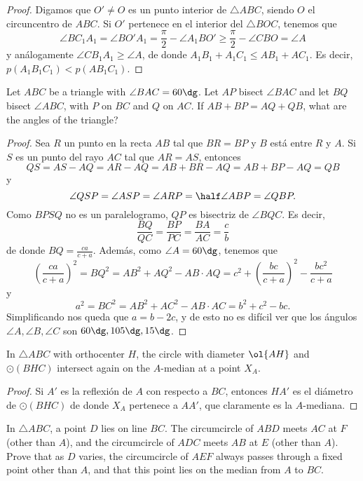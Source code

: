 \begin{proof}
	Digamos que $O'\ne O$ es un punto interior de $\triangle ABC$, siendo $O$ el circuncentro de $ABC$. Si $O'$ pertenece en el interior del $\triangle BOC$, tenemos que
	\[\angle BC_1A_1=\angle BO'A_1=\frac{\pi}{2}-\angle A_1BO'\ge\frac{\pi}{2}-\angle CBO=\angle A\]
	y análogamente $\angle CB_1A_1\ge\angle A$, de donde $A_1B_1+A_1C_1\le AB_1+AC_1$. Es decir, $p(A_1B_1C_1)<p(AB_1C_1)$.
\end{proof}

\begin{probEG}[ISL 2001/G8]
	Let $ABC$ be a triangle with $\angle BAC=60\dg$. Let $AP$ bisect $\angle BAC$ and let $BQ$ bisect $\angle ABC$, with $P$ on $BC$ and $Q$ on $AC$. If $AB+BP=AQ+QB$, what are the angles of the triangle?
\end{probEG}

\begin{proof}
	Sea $R$ un punto en la recta $AB$ tal que $BR=BP$ y $B$ está entre $R$ y $A$. Si $S$ es un punto del rayo $AC$ tal que $AR=AS$, entonces
	\[QS=AS-AQ=AR-AQ=AB+BR-AQ=AB+BP-AQ=QB\]
	y
	\[\angle QSP=\angle ASP=\angle ARP=\half\angle ABP=\angle QBP.\]
	Como $BPSQ$ no es un paralelogramo, $QP$ es bisectriz de $\angle BQC$. Es decir,
	\[\frac{BQ}{QC}=\frac{BP}{PC}=\frac{BA}{AC}=\frac{c}{b}\]
	de donde $BQ=\frac{ca}{c+a}$. Además, como $\angle A=60\dg$, tenemos que
	\[\left(\frac{ca}{c+a}\right)^2=BQ^2=AB^2+AQ^2-AB\cdot AQ=c^2+\left(\frac{bc}{c+a}\right)^2-\frac{bc^2}{c+a}\]
	y
	\[a^2=BC^2=AB^2+AC^2-AB\cdot AC=b^2+c^2-bc.\]
	Simplificando nos queda que $a=b-2c$, y de esto no es difícil ver que los ángulos $\angle A,\angle B,\angle C$ son $60\dg,105\dg,15\dg$.
\end{proof}


\begin{probEG}
	In $\triangle ABC$ with orthocenter $H$, the circle with diameter $\ol{AH}$ and $\odot(BHC)$ intersect again on the $A$-median at a point $X_A$.
\end{probEG}

\begin{proof}
	Si $A'$ es la reflexión de $A$ con respecto a $BC$, entonces $HA'$ es el diámetro de $\odot(BHC)$ de donde $X_A$ pertenece a $AA'$, que claramente es la $A$-mediana.
\end{proof}

\begin{probEG}[ELMO SL 2013/G3]
	In $\triangle ABC$, a point $D$ lies on line $BC$. The circumcircle of $ABD$ meets $AC$ at $F$ (other than $A$), and the circumcircle of $ADC$ meets $AB$ at $E$ (other than $A$). Prove that as $D$ varies, the circumcircle of $AEF$ always passes through a fixed point other than $A$, and that this point lies on the median from $A$ to $BC$.
\end{probEG}

